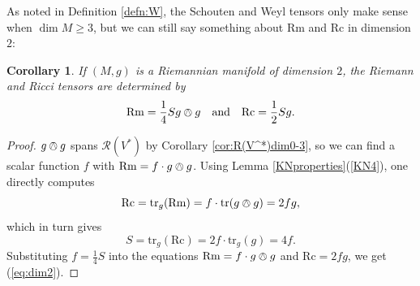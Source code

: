 \documentclass{amsart}
\numberwithin{equation}{section}
\def\~#1{\mathscr{#1}}
\newcommand{\tr}{\mathrm{tr}}
\newcommand{\Rc}{\mathrm{Rc}}
\newcommand{\Rm}{\mathrm{Rm}}
\theoremstyle{plain}
\newtheorem{cor}[thm]{Corollary}
\theoremstyle{definition}
\theoremstyle{remark}
\begin{document}
As noted in Definition \ref{defn:W}, the Schouten and Weyl tensors only make sense when $\dim M \ge 3$, but we can still say something about $\Rm$ and $\Rc$ in dimension $2$:
\begin{cor}
    If $(M, g)$ is a Riemannian manifold of dimension $2$, the Riemann and Ricci tensors are determined by
    \begin{equation}\label{eq:dim2}
    \Rm = \frac{1}{4} S g \owedge g \quad \text{and} \quad \Rc = \frac{1}{2}Sg.\end{equation}
\end{cor}
\begin{proof}
    $g\owedge g$ spans $\~R(V^*)$ by Corollary \ref{cor:R(V^*)dim0-3}, so we can find a scalar function $f$ with $\Rm = f \cdot g \owedge g$. Using Lemma \ref{KNproperties}(\ref{KN4}), one directly computes
    \[\Rc = \tr_g(\Rm) = f\cdot\tr(g \owedge g) = 2f g,\]
    which in turn gives
    \[S = \tr_g(\Rc) = 2f \cdot \tr_g(g) = 4f.\]
    Substituting $f = \frac{1}{4}S$ into the equations $\Rm = f \cdot g \owedge g$ and $\Rc = 2fg$, we get (\ref{eq:dim2}).
\end{proof}
\end{document}
